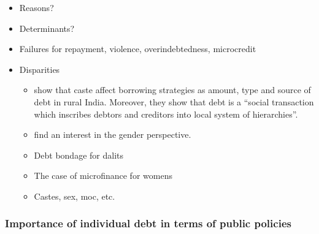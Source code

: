 \documentclass[a4paper, 11pt, onecolumn]{article}
\begin{document}
\begin{itemize}
\item Reasons?

\item Determinants?  \citep{Datta2018, Pandey2016}

\item Failures for repayment, violence, overindebtedness, microcredit \citep{Sedai2021}
\item Disparities 
	\begin{itemize}
	\item \cite{Guerin2013} show that caste affect borrowing strategies as amount, type and source of debt in rural India.
	Moreover, they show that debt is a ``social transaction which inscribes debtors and creditors into local system of hierarchies''.
	\item \cite{Reboul2021} find an interest in the gender perspective.
	\item Debt bondage for dalits \citep{Guerin2020a}
	\item The case of microfinance for womens \citep{Guerin2020b}
	\item  Castes, sex, moc, etc.  \citep{Guerin2012a} \citep{Guerin2013a} \citep{Guerin2014} \citep{Reboul2020}
	\end{itemize}
\end{itemize}



		\subsubsection{Importance of individual debt in terms of public policies}
\end{document}
